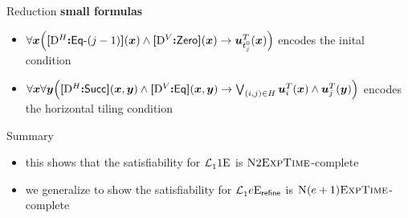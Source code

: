 \documentclass{beamer}
\begin{document}
\begin{frame}{Reduction}
\textbf{small formulas}
\begin{itemize}
  \item $\forall\bm{x} \Big({\bm{[}{\mathrm{D}}^H\mathord{\bm{:}}\mathsf{Eq}{\hbox{-}}(j-1)\bm{]}}(\bm{x}) \land {\bm{[}{\mathrm{D}}^V\mathord{\bm{:}}\mathsf{Zero}\bm{]}}(\bm{x})
  \rightarrow \bm{u}_{t_{j}^0}^{T}(\bm{x})\Big)$ encodes the inital condition
  \item $\forall\bm{x}\forall\bm{y} \Big({\bm{[}{\mathrm{D}}^H\mathord{\bm{:}}\mathsf{Succ}\bm{]}}(\bm{x},\bm{y}) \land
  {\bm{[}{\mathrm{D}}^V\mathord{\bm{:}}\mathsf{Eq}\bm{]}}(\bm{x},\bm{y}) \rightarrow
  \bigvee_{(i,j) \in H} \bm{u}_{i}^{T}(\bm{x}) \land
  \bm{u}_{j}^{T}(\bm{y})\Big)$ encodes the horizontal tiling condition
\end{itemize}
\end{frame}

\begin{frame}{Summary}
\begin{itemize}
  \item
  this shows that the satisfiability for $\mathcal{L}^{{}}_{1}{1}\mathrm{E}_{{}}$ is
  $\text{\normalfont{\scshape N}}2\text{\normalfont{\scshape ExpTime}}$-complete
  
  \item we generalize to show the satisfiability for
  $\mathcal{L}^{{}}_{1}{e}\mathrm{E}_{\mathsf{refine}}$ is $\text{\normalfont{\scshape N}}(e+1)\text{\normalfont{\scshape ExpTime}}$-complete
\end{itemize}
\end{frame}
\end{document}
